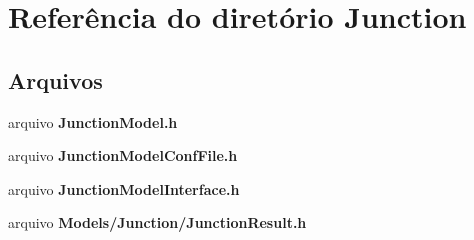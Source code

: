 \section{Referência do diretório Junction}
\label{dir_81d0e04db0634fb3231ed889cba68811}
\subsection*{Arquivos}
\begin{DoxyCompactItemize}
\item 
arquivo {\bf Junction\+Model.\+h}
\item 
arquivo {\bf Junction\+Model\+Conf\+File.\+h}
\item 
arquivo {\bf Junction\+Model\+Interface.\+h}
\item 
arquivo {\bf Models/\+Junction/\+Junction\+Result.\+h}
\end{DoxyCompactItemize}
